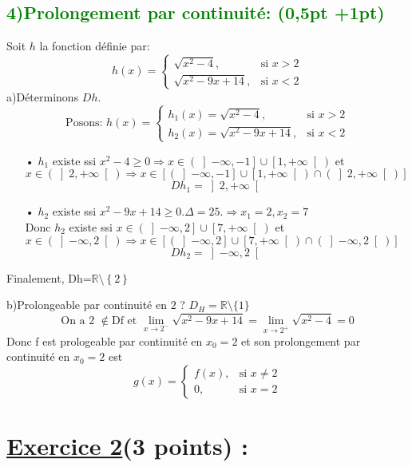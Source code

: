 \documentclass{article}
\begin{document}
\subsection*{ \textcolor{green}{4)Prolongement par continuité: (0,5pt +1pt)}}
Soit $h$ la fonction définie par:
\[ h(x) = \begin{cases} 
  \sqrt{x^{2}-4}, & \text{si } x > 2 \\
  \sqrt{x^{2}-9x+14}, & \text{si } x < 2
\end{cases} \]
a)Déterminons $Dh$.\\
\[\text{Posons: } h(x) = \begin{cases} 
  h_{1}(x)=\sqrt{x^{2}-4}, & \text{si } x > 2 \\
  h_{2}(x)=\sqrt{x^{2}-9x+14}, & \text{si } x < 2
\end{cases} \]
\begin{itemize}
\item[•]$h_{1}$ existe ssi $x^{2}-4\geq0 \Rightarrow x\in \left( \left]-\infty, -1\right] \cup \left[1, +\infty\right[ \right) $ et $x \in\left( \left]2, +\infty\right[\right) \Rightarrow x\in \left[ \left( \left]-\infty, -1\right] \cup \left[1, +\infty\right[ \right)\cap\left( \left]2, +\infty\right[\right) \right] $
\[Dh_{1}=\left]2, +\infty\right[ \]
\item[•]$h_{2}$ existe ssi $x^{2}-9x+14 \geq 0. \Delta = 25. \Rightarrow x_{1}=2, x_{2}=7$\\
Donc $h_{2}$ existe ssi $x\in \left( \left]-\infty, 2\right] \cup \left[7, +\infty\right[ \right) $ et $x \in\left( \left]-\infty, 2\right[\right) \Rightarrow x\in \left[ \left( \left]-\infty, 2\right] \cup \left[7, +\infty\right[ \right)\cap\left( \left]-\infty, 2\right[\right) \right]$
\[Dh_{2}=\left]-\infty, 2\right[ \] 
\end{itemize}
Finalement, Dh=$\mathbb{R}\setminus\left\lbrace 2 \right\rbrace $

b)Prolongeable par continuité en $2$ ?
$D_{H}=\mathbb{R}\setminus\{1\}$\\
\[\text{On a 2 }\notin \text{Df et } \lim_{x \to 2^{-}}\sqrt{x^{2}-9x+14}=\lim_{x \to 2^{+}}\sqrt{x^{2}-4}=0\]
Donc f est prologeable par continuité en $x_{0}=2$ et son prolongement par continuité en $x_{0}=2$ est 
\[ g(x) = \begin{cases} 
  f(x), & \text{si } x \neq 2 \\
  0, & \text{si } x= 2
\end{cases} \]
\section*{\underline{Exercice 2}(3 points) :}
\end{document}
